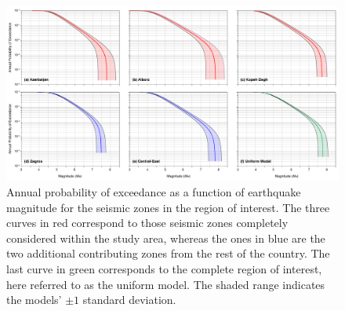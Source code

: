 
\begin{figure}[t]
    \centering
    \includegraphics[width=\textwidth]{figures/pdf/figure-07}
    \caption{Annual probability of exceedance as a function of earthquake magnitude for the seismic zones in the region of interest. The three curves in red correspond to those seismic zones completely considered within the study area, whereas the ones in blue are the two additional contributing zones from the rest of the country. The last curve in green corresponds to the complete region of interest, here referred to as the uniform model. The shaded range indicates the models' $\pm 1$ standard deviation.}
    \label{fig:annualp}
\end{figure}
